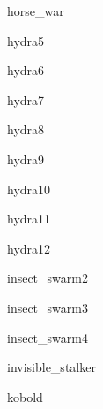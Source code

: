 \documentclass[letterpaper,serif]{module}
\begin{document}
\begin{newmonster}{horse_war}\end{newmonster}

\begin{newmonster}{hydra5}\end{newmonster}

\begin{newmonster}{hydra6}\end{newmonster}

\begin{newmonster}{hydra7}\end{newmonster}

\begin{newmonster}{hydra8}\end{newmonster}

\begin{newmonster}{hydra9}\end{newmonster}

\begin{newmonster}{hydra10}\end{newmonster}

\begin{newmonster}{hydra11}\end{newmonster}

\begin{newmonster}{hydra12}\end{newmonster}

\begin{newmonster}{insect_swarm2}\end{newmonster}

\begin{newmonster}{insect_swarm3}\end{newmonster}

\begin{newmonster}{insect_swarm4}\end{newmonster}

\begin{newmonster}{invisible_stalker}\end{newmonster}

\begin{newmonster}{kobold}\end{newmonster}
\end{document}
